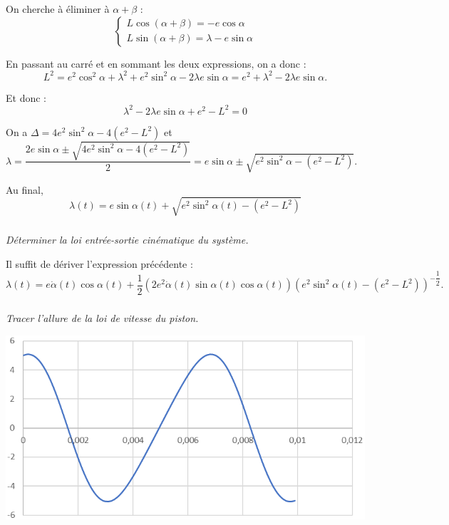 \documentclass[10pt,fleqn]{article} %
\begin{document}
\begin{multicols}{2}
\begin{corrige}
On cherche à éliminer à $\alpha+\beta$ :
$$
\left\{
\begin{array}{l}
L\cos\left(\alpha+\beta\right)  = - e\cos\alpha \\
L \sin\left(\alpha+\beta\right) =  \lambda - e\sin\alpha
\end{array}
\right.
$$

En passant au carré et en sommant les deux expressions, on a donc : 
$$
L^2=e^2\cos^2\alpha + \lambda^2 + e^2\sin^2\alpha-2\lambda e \sin\alpha
=e^2+ \lambda^2 -2\lambda e \sin\alpha.
$$

Et donc :
$$
 \lambda^2 -2\lambda e \sin\alpha+e^2-L^2=0
$$


On a $\Delta = 4e^2\sin^2\alpha - 4\left(e^2 - L^2 \right)$ et 
$\lambda 
= \dfrac{2 e \sin\alpha\pm \sqrt{4e^2\sin^2\alpha - 4\left(e^2 - L^2 \right)}}{2}
=  e \sin\alpha\pm \sqrt{e^2\sin^2\alpha - \left(e^2 - L^2 \right)}$.

Au final, 
$$\lambda(t)=  e \sin\alpha(t)+ \sqrt{e^2\sin^2\alpha(t) - \left(e^2 - L^2 \right)}$$



\end{corrige}
\else
\fi
\subparagraph{}\textit{Déterminer la loi entrée-sortie cinématique du système.}
\ifprof
\begin{corrige}
Il suffit de dériver l'expression précédente :
$$\lambda(t)=  e \dot{\alpha}(t)\cos\alpha(t)+ \dfrac{1}{2}\left(2e^2\dot{\alpha}(t)\sin\alpha(t)\cos\alpha(t) \right)\left(e^2\sin^2\alpha(t) - \left(e^2 - L^2 \right)\right)^{-\dfrac{1}{2}}.$$
\end{corrige}
\else
\fi

\subparagraph{}\textit{Tracer l'allure de la loi de vitesse du piston.}
\ifprof
\begin{corrige}
\begin{center}
\includegraphics[width=\linewidth]{images/fig_08}
\end{center}
\end{corrige}
\else
\fi



\end{multicols}
\end{document}
